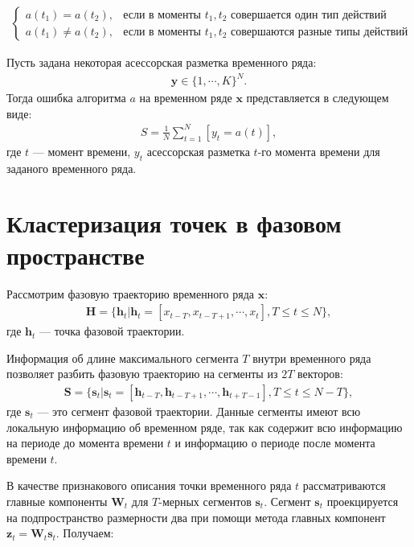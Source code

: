 \[
\label{eq:st:5}
\begin{aligned}
\begin{cases}
    a\left(t_1\right) = a\left(t_2\right), &  \text{если в моменты } t_1, t_2 \text{ совершается один тип действий}\\
    a\left(t_1\right) \not= a\left(t_2\right), &  \text{если в моменты } t_1, t_2 \text{ совершаются разные типы действий }
\end{cases}
\end{aligned}
\]

Пусть задана некоторая асессорская разметка временного ряда:
\[
\label{eq:st:6}
\begin{aligned}
\textbf{y} \in \{1,\cdots,K\}^{N}.
\end{aligned}
\]
Тогда ошибка алгоритма $a$ на временном ряде $\textbf{x}$ представляется в следующем виде:
\[
\label{eq:st:7}
\begin{aligned}
S = \frac{1}{N}\sum_{t=1}^{N}[y_t = a\left(t\right)],
\end{aligned}
\]
где $t$ --- момент времени, $y_t$ асессорская разметка $t$-го момента времени для заданого временного ряда.


\section{Кластеризация точек в фазовом пространстве}
Рассмотрим фазовую траекторию временного ряда $\textbf{x}$:
\[
\label{eq:cl:1}
\begin{aligned}
\mathbf{H} = \{\textbf{h}_t| \textbf{h}_t = [x_{t-T}, x_{t-T+1}, \cdots, x_{t}], T\leq t\leq N\},
\end{aligned}
\]
где $\textbf{h}_t$ --- точка фазовой траектории.

Информация об длине максимального сегмента $T$ внутри временного ряда позволяет разбить фазовую траекторию на сегменты из $2T$ векторов:
\[
\label{eq:cl:2}
\begin{aligned}
\mathbf{S} = \{\textbf{s}_t| \textbf{s}_t = [\textbf{h}_{t-T}, \textbf{h}_{t-T+1}, \cdots, \textbf{h}_{t+T-1}], T\leq t\leq N-T\},
\end{aligned}
\]
где $\textbf{s}_t$ --- это сегмент фазовой траектории. Данные сегменты имеют всю локальную информацию об временном ряде, так как содержит всю информацию на периоде до момента времени $t$ и информацию о периоде после момента времени $t$.

В качестве признакового описания точки временного ряда $t$ рассматриваются главные компоненты $\textbf{W}_t$ для $T\text{-мерных}$ сегментов $\textbf{s}_t$. Сегмент $\textbf{s}_t$ проекцируется на подпространство размерности два при помощи метода главных  компонент $\textbf{z}_t = \textbf{W}_t\textbf{s}_t$. Получаем:

